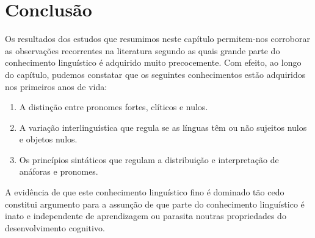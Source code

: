 \documentclass[output=paper]{LSP/langsci}
\begin{document}
\section{Conclusão}
\label{sec:costa_conclusao}

Os resultados dos estudos que resumimos neste capítulo permitem-nos corroborar as observações recorrentes na literatura segundo as quais grande parte do conhecimento linguístico é adquirido muito precocemente. Com efeito, ao longo do capítulo, pudemos constatar que os seguintes conhecimentos estão adquiridos nos primeiros anos de vida:

\begin{enumerate}[label=\alph*)]
\item A distinção entre pronomes fortes, clíticos e nulos.
\item A variação interlinguística que regula se as línguas têm ou não sujeitos nulos e objetos nulos.
\item Os princípios sintáticos que regulam a distribuição e interpretação de anáforas e pronomes.
\end{enumerate}

A evidência de que este conhecimento linguístico fino é dominado tão cedo constitui argumento para a assunção de que parte do conhecimento linguístico é inato e independente de aprendizagem ou parasita noutras propriedades do desenvolvimento cognitivo.



{\sloppy
\printbibliography[heading=subbibliography,notkeyword=this]
}
\end{document}
